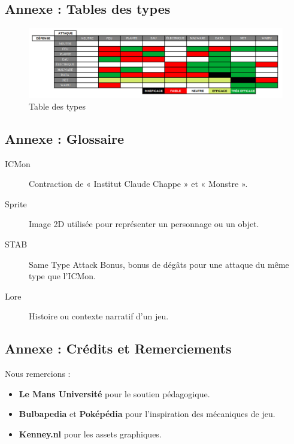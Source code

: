 \documentclass[12pt,a4paper, twoside]{article}
\begin{document}
\subsection{Annexe : Tables des types}
 \begin{figure}[h]
    \centering
    \includegraphics[width=1\textwidth]{DiagrammeType.png} %
    \caption{Table des types}
    \label{fig:typetable}
\end{figure}

\subsection{Annexe : Glossaire}
\begin{description}
    \item[ICMon] Contraction de « Institut Claude Chappe » et « Monstre ».
    \item[Sprite] Image 2D utilisée pour représenter un personnage ou un objet.
    \item[STAB] Same Type Attack Bonus, bonus de dégâts pour une attaque du même type que l'ICMon.
    \item[Lore] Histoire ou contexte narratif d'un jeu.
\end{description}

\subsection{Annexe : Crédits et Remerciements}
Nous remercions :
\begin{itemize}
    \item \textbf{Le Mans Université} pour le soutien pédagogique.
    \item \textbf{Bulbapedia} et \textbf{Poképédia} pour l'inspiration des mécaniques de jeu.
    \item \textbf{Kenney.nl} pour les assets graphiques.
\end{itemize}
\end{document}

